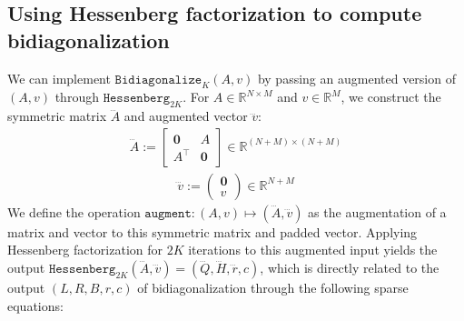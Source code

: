 \documentclass[a4paper,12pt]{article}
\theoremstyle{definition}
\begin{document}
\subsection{Using Hessenberg factorization to compute bidiagonalization}\label{sec:bidiag_through_hessenberg}
We can implement $\texttt{Bidiagonalize}_K(A, v)$ by passing an augmented version of $(A, v)$ through $\texttt{Hessenberg}_{2K}$. For $A \in \mathbb{R}^{N \times M}$ and $v \in \mathbb{R}^M$, we construct the symmetric matrix $\dddot{A}$ and augmented vector $\dddot{v}$:
\begin{align}
    \dddot{A} := \begin{bmatrix}\mathbf{0} & A \\ A^\top & \mathbf{0}\end{bmatrix} \in \mathbb{R}^{(N+M) \times (N+M)} \label{eq:A_sparsity_pattern}
\end{align}
    \begin{align}
\dddot{v} := \begin{pmatrix}\mathbf{0} \\ v \end{pmatrix} \in \mathbb{R}^{N+M} \label{eq:v_sparsity_pattern}
\end{align}
We define the operation $\texttt{augment}: (A, v) \mapsto (\dddot{A}, \dddot{v})$ as the augmentation of a matrix and vector to this symmetric matrix and padded vector.
Applying Hessenberg factorization for $2K$ iterations to this augmented input yields the output
$\texttt{Hessenberg}_{2K}(\dddot{A}, \dddot{v}) = (\dddot{Q}, \dddot{H}, \dddot{r}, c)$,
which is directly related to the output $(L, R, B, r, c)$ of bidiagonalization through the following sparse equations:
\end{document}
